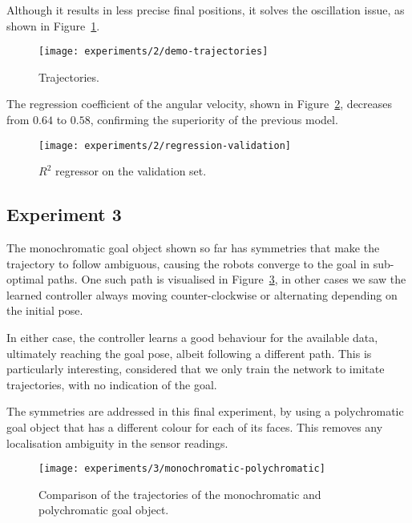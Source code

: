  
Although it results in less precise final positions, it solves the oscillation 
issue, as shown in Figure~\ref{fig:demo-trajectories}.

\begin{figure}[htbp]
	\centerline{\texttt{[image: experiments/2/demo-trajectories]}}
	\caption{Trajectories.}
	\label{fig:demo-trajectories}
\end{figure}

The regression coefficient of the angular velocity, shown in 
Figure~\ref{fig:regression-validation}, decreases from $0.64$ to $0.58$, 
confirming the superiority of the previous model.

\begin{figure}[htbp]
	\centerline{\texttt{[image: experiments/2/regression-validation]}}
	\caption{$R^2$ regressor on the validation set.}
	\label{fig:regression-validation}
\end{figure}

\subsection{Experiment 3}
\label{experiment3}

The monochromatic goal object shown so far has symmetries that make the 
trajectory to follow ambiguous, causing the robots converge to the goal in 
sub-optimal paths. One such path is visualised in 
Figure~\ref{fig:demo-circle-trajectories}, in other cases we saw the learned 
controller always moving counter-clockwise or alternating depending on the 
initial pose. 

In either case, the controller learns a good behaviour for the available data, 
ultimately reaching the goal pose, albeit following a different path. This is 
particularly interesting, considered that we only train the network to imitate 
trajectories, with no indication of the goal.

The symmetries are addressed in this final experiment, by using a polychromatic 
goal object that has a different colour for each of its faces. This removes any 
localisation ambiguity in the sensor readings.

\begin{figure}[htbp]
	\centerline{\texttt{[image: experiments/3/monochromatic-polychromatic]}}
	\caption{Comparison of the trajectories of the monochromatic and 
	polychromatic goal object.}
	\label{fig:demo-circle-trajectories}
\end{figure}

